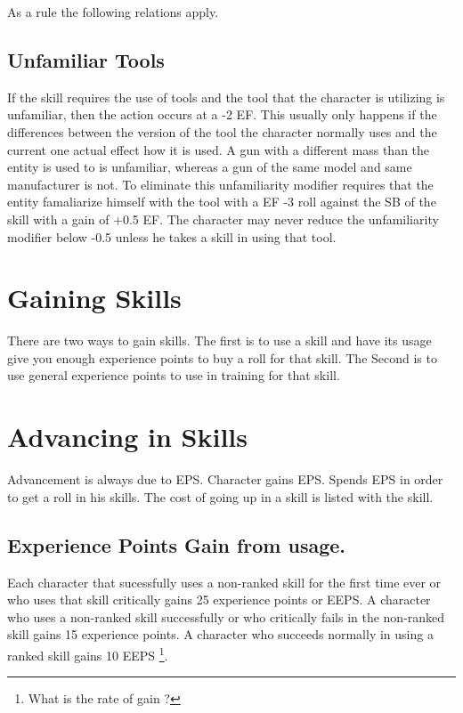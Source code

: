 As a rule the following relations apply.



\subsection{Unfamiliar Tools}

If the skill requires the use of tools and the tool that the character is
utilizing is unfamiliar, then the action occurs at a -2 EF. This usually
only happens if the differences between the version of the tool the
character normally uses and the current one actual effect how it is
used. A gun with a different mass than the entity is used to is
unfamiliar, whereas a gun of the same model and same manufacturer is
not. To eliminate this unfamiliarity modifier requires that the entity
famaliarize himself with the tool with a EF -3 roll against the SB of 
the skill with a gain of +0.5 EF. The character may never reduce the 
unfamiliarity modifier below -0.5 unless he takes a skill in using 
that tool.

\section{Gaining Skills}

There are two ways to gain skills. The first is to use a skill and have
its usage give you enough experience points to buy a roll for that
skill. The Second is to use general experience points to use in
training for that skill.

\section{Advancing in Skills}

Advancement is always due to EPS. Character gains EPS. Spends EPS in order
to get a roll in his skills. The cost of going up in a skill is listed with
the skill.         

\subsection{Experience Points Gain from usage.}

Each character that sucessfully uses a non-ranked skill for the first 
time ever or who uses that skill critically  gains 25 experience 
points or EEPS. A character who uses a non-ranked skill successfully 
or who critically fails in the non-ranked skill gains 15 experience 
points. A character who succeeds normally in using a ranked skill gains
10 EEPS \footnote{What is the rate of gain ?}.

